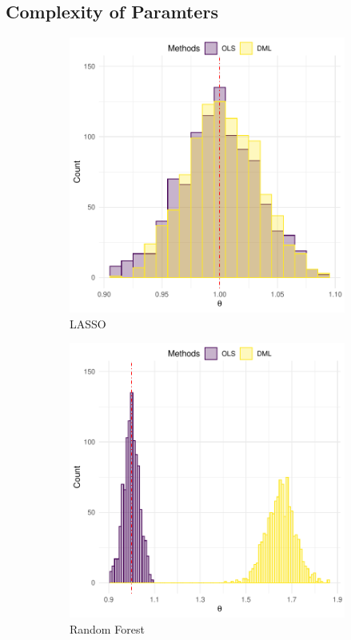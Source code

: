 \documentclass[en,mtpro2]{elegantpaper}
\begin{document}
\subsection{Complexity of Paramters}

\begin{figure}[htpb]
    \centering
    \begin{subfigure}{.45\textwidth}
        \centering
        \includegraphics[width=\linewidth]{figures/intution-ols-vs-dml-lasso.pdf}
        \caption{LASSO}
    \end{subfigure}
    \begin{subfigure}{.45\textwidth}
        \centering
        \includegraphics[width=\linewidth]{figures/intution-ols-vs-dml-rf.pdf}
        \caption{Random Forest}
    \end{subfigure}
    \caption{}
\end{figure}
\end{document}
